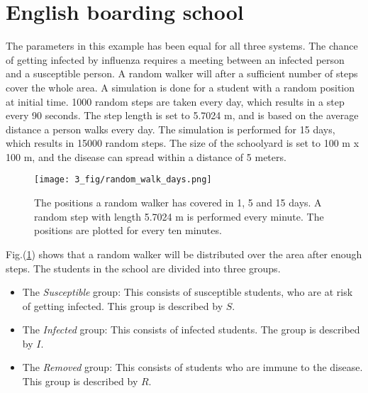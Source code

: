 \documentclass[%
twoside,                 %
final,                   %
chapterprefix=true,      %
open=right               %
10pt]{book}
\begin{document}
\section{English boarding school}
The parameters in this example has been equal for all three systems. The chance of getting infected by influenza requires a meeting between an infected person and a susceptible person. A random walker will after a sufficient number of steps cover the whole area. A simulation is done for a student with a random position at initial time. 1000 random steps are taken every day, which results in a step every 90 seconds. The step length is set to 5.7024 m, and is based on the average distance a person walks every day. The simulation is performed for 15 days, which results in 15000 random steps. The size of the schoolyard is set to 100 m x 100 m, and the disease can spread within a distance of 5 meters.


\vspace{3mm}




\vspace{3mm}



\begin{figure}[ht]
  \centerline{\texttt{[image: 3\_fig/random\_walk\_days.png]}}
  \caption{
  \label{fig:random_walker_days} The positions a random walker has covered in 1, 5 and 15 days. A random step with length 5.7024 m is performed every minute. The positions are plotted for every ten minutes.
  }
\end{figure}


Fig.(\ref{fig:random_walker_days}) shows that a random walker will be distributed over the area after enough steps. The students in the school are divided into three groups. 
\begin{itemize}
\item The \emph{Susceptible} group: This consists of susceptible students, who are at risk of getting infected. This group is described by $S$. 

\item The \emph{Infected} group: This consists of infected students. The group is described by $I$. 

\item The \emph{Removed} group: This consists of students who are immune to the disease. This group is described by $R$. 
\end{itemize}
\end{document}
